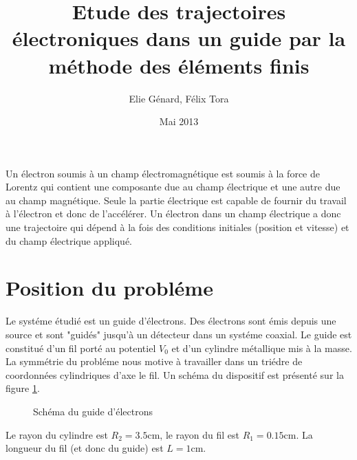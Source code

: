 \documentclass[a4paper,12pt]{article}
\title{Etude des trajectoires électroniques dans un guide par la méthode des éléments finis}
\author{Elie Génard, Félix Tora}
\date{Mai 2013}
\begin{document}
\maketitle

Un électron soumis à un champ électromagnétique est soumis à la force de Lorentz qui contient une composante due au champ électrique et une autre due au champ magnétique. Seule la partie électrique est capable de fournir du travail à l'électron et donc de l'accélérer. Un électron dans un champ électrique a donc une trajectoire qui dépend à la fois des conditions initiales (position et vitesse) et du champ électrique appliqué.

\section{Position du probléme}

Le systéme étudié est un guide d'électrons. Des électrons sont émis depuis une source et sont "guidés" jusqu'à un détecteur dans un systéme coaxial. Le guide est constitué d'un fil porté au potentiel $V_0$ et d'un cylindre métallique mis à la masse. La symmétrie du probléme nous motive à travailler dans un triédre de coordonnées cylindriques d'axe le fil. Un schéma du dispositif est présenté sur la figure \ref{fig:schema}.

\begin{figure}[h]
\centering
{}
\caption{Schéma du guide d'électrons}
\label{fig:schema}
\end{figure}
Le rayon du cylindre est $R_2 = 3.5 \mathrm{cm}$, le rayon du fil est $R_1 = 0.15 \mathrm{cm}$. La longueur du fil (et donc du guide) est $L = 1 \mathrm{cm}$.
\end{document}
